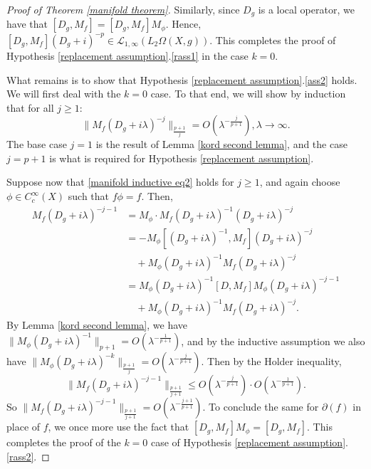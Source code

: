 \begin{proof}[Proof of Theorem \ref{manifold theorem}]
        Similarly, since $D_g$ is a local operator, we have that $[D_g,M_f] = [D_g,M_f]M_{\phi}$. Hence, $[D_g,M_f](D_g+i)^{-p} \in \mathcal{L}_{1,\infty}(L_2\Omega(X,g))$. This completes the proof of Hypothesis \ref{replacement assumption}.\eqref{rass1}
        in the case $k=0$.
        
        What remains is to show that Hypothesis \ref{replacement assumption}.\eqref{ass2} holds. We will first deal with the $k=0$ case. To that end, we will show by induction that for all $j\geq 1$:
        \begin{equation}\label{manifold inductive eq2}
            \|M_f(D_g+i\lambda)^{-j}\|_{\frac{p+1}{j}} = O(\lambda^{-\frac{j}{p+1}}),\lambda\to\infty.
        \end{equation}
        The base case $j = 1$ is the result of Lemma \ref{kord second lemma}, and the case $j=p+1$ is what is required for Hypothesis \ref{replacement assumption}.
        
        Suppose now that \eqref{manifold inductive eq2} holds for $j\geq 1$, and again choose $\phi\in C^\infty_c(X)$ such that $f\phi = f$. Then,
        \begin{align*}
            M_f(D_g+i\lambda)^{-j-1}  &= M_{\phi}\cdot M_f(D_g+i\lambda)^{-1}(D_g+i\lambda)^{-j}\\
                                      &= -M_{\phi}[(D_g+i\lambda)^{-1},M_f](D_g+i\lambda)^{-j}\\
                                      &\quad+M_{\phi}(D_g+i\lambda)^{-1}M_f(D_g+i\lambda)^{-j}\\
                                      &= M_{\phi}(D_g+i\lambda)^{-1}[D,M_f]M_{\phi}(D_g+i\lambda)^{-j-1}\\
                                      &\quad+M_{\phi}(D_g+i\lambda)^{-1}M_f(D_g+i\lambda)^{-j}.
        \end{align*}    
        By Lemma \ref{kord second lemma}, we have $\|M_{\phi}(D_g+i\lambda)^{-1}\|_{p+1} = O(\lambda^{-\frac{1}{p+1}})$, and by the inductive assumption
        we also have $\|M_{\phi}(D_g+i\lambda)^{-k}\|_{\frac{p+1}{j}} = O(\lambda^{-\frac{j}{p+1}})$. Then by the Holder inequality,
        \begin{equation*}
            \|M_f(D_g+i\lambda)^{-j-1}\|_{\frac{p+1}{j+1}} \leq O(\lambda^{-\frac{j}{p+1}})\cdot O(\lambda^{-\frac{1}{p+1}}).
        \end{equation*}
        So $\|M_f(D_g+i\lambda)^{-j-1}\|_{\frac{p+1}{j+1}} = O(\lambda^{-\frac{j+1}{p+1}})$. To conclude the same for $\partial(f)$ in place of $f$, we once more use the fact that $[D_g,M_f]M_{\phi} = [D_g,M_f]$.
        This completes the proof of the $k=0$ case of Hypothesis \ref{replacement assumption}.\eqref{rass2}.
        

\end{proof}
